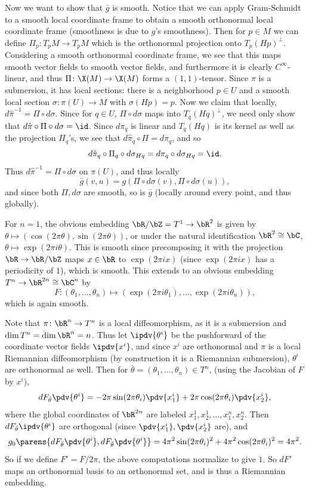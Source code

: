     Now we want to show that $\bar g$ is smooth.
    Notice that we can apply Gram-Schmidt to a smooth local coordinate frame to obtain a smooth orthonormal local coordinate frame (smoothness is due to $g$'s smoothness).
    Then for $p\in M$ we can define $\Pi_p\colon T_pM\to T_pM$ which is the orthonormal projection onto $T_p(Hp)^\perp$.
    Considering a smooth orthonormal coordinate frame, we see that this maps smooth vector fields to smooth vector fields, and furthermore it is clearly $C^\infty$-linear,
    and thus $\Pi\colon\X(M)\to\X(M)$ forms a $(1,1)$-tensor.
    Since $\pi$ is a submersion, it has local sections: there is a neighborhood $p\in U$ and a smooth local section $\sigma\colon\pi(U)\to M$ with $\sigma(Hp)=p$.
    Now we claim that locally, $d\hat\pi^{-1}=\Pi\circ d\sigma$.
    Since for $q\in U$, $\Pi\circ d\sigma$ maps into $T_q(Hq)^\perp$, we need only show that $d\hat\pi\circ\Pi\circ d\sigma=\id$.
    Since $d\pi_q$ is linear and $T_q(Hq)$ is its kernel as well as the projection $\Pi_q$'s, we see that $d\hat\pi_q\circ\Pi=d\pi_q$, and so
    $$ d\hat\pi_q\circ\Pi_q\circ d\sigma_{Hq} = d\pi_q\circ d\sigma_{Hq} = \id . $$
    Thus $d\hat\pi^{-1}=\Pi\circ d\sigma$ on $\pi(U)$, and thus locally
    $$ \bar g(v,u) = g(\Pi\circ d\sigma(v),\Pi\circ d\sigma(u)) , $$
    and since both $\Pi,d\sigma$ are smooth, so is $\bar g$ (locally around every point, and thus globally).

    \item For $n=1$, the obvious embedding $\bR/\bZ=T^1\to\bR^2$ is given by $\theta\mapsto(\cos(2\pi\theta),\sin(2\pi\theta))$, or under the natural identification $\bR^2\cong\bC$,
    $\theta\mapsto\exp(2\pi i\theta)$.
    This is smooth since precomposing it with the projection $\bR\to\bR/\bZ$ maps $x\in\bR$ to $\exp(2\pi ix)$ (since $\exp(2\pi ix)$ has a periodicity of $1$), which is smooth.
    This extends to an obvious embedding $T^n\to\bR^{2n}\cong\bC^n$ by
    $$ F\colon (\theta_1,\dots,\theta_n) \mapsto (\exp(2\pi i\theta_1),\dots,\exp(2\pi i\theta_n)) , $$
    which is again smooth.

    Note that $\pi\colon\bR^n\to T^n$ is a local diffeomorphism, as it is a submersion and $\dim T^n=\dim\bR^n=n$.
    Thus let $\ipdv{\theta^i}$ be the pushforward of the coordinate vector fields $\ipdv{x^i}$, and since $x^i$ are orthonormal and $\pi$ is a local Riemannian diffeomorphism (by construction it is a
    Riemannian submersion), $\theta^i$ are orthonormal as well.
    Then for $\bar\theta=(\theta_1,\dots,\theta_n)\in T^n$, (using the Jacobian of $F$ by $x^i$),
    $$ dF_{\bar\theta}\pdv{\theta^i} = -2\pi\sin(2\pi\theta_i)\pdv{x^i_1} + 2\pi\cos(2\pi\theta_i)\pdv{x^i_2} , $$
    where the global coordinates of $\bR^{2n}$ are labeled $x^1_1,x^1_2,\dots,x^n_1,x^n_2$.
    Then $dF_{\bar\theta}\ipdv{\theta^i}$ are orthogonal (since $\pdv{x^i_1},\pdv{x^i_2}$ are), and
    $$ g_0\parens{dF_{\bar\theta}\pdv{\theta^i},dF_{\bar\theta}\pdv{\theta^i}} = 4\pi^2\sin(2\pi\theta_i)^2 + 4\pi^2\cos(2\pi\theta_i)^2 = 4\pi^2 . $$
    So if we define $F'=F/2\pi$, the above computations normalize to give $1$.
    So $dF'$ maps an orthonormal basis to an orthonormal set, and is thus a Riemannian embedding.
\eenum

